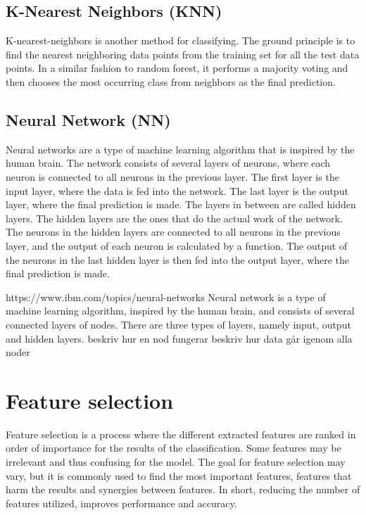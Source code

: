 \documentclass{kththesis}
\begin{document}

\subsection{K-Nearest Neighbors (KNN)}

K-nearest-neighbors is another method for classifying. The ground principle is to find the nearest neighboring data points from the training set for all the test data points. In a similar fashion to random forest, it performs a majority voting and then chooses the most occurring class from neighbors as the final prediction.


\subsection{Neural Network (NN)}

Neural networks are a type of machine learning algorithm that is inspired by the human brain. The network consists of several layers of neurons, where each neuron is connected to all neurons in the previous layer. The first layer is the input layer, where the data is fed into the network. The last layer is the output layer, where the final prediction is made. The layers in between are called hidden layers. The hidden layers are the ones that do the actual work of the network. The neurons in the hidden layers are connected to all neurons in the previous layer, and the output of each neuron is calculated by a function. The output of the neurons in the last hidden layer is then fed into the output layer, where the final prediction is made.


https://www.ibm.com/topics/neural-networks
Neural network is a type of machine learning algorithm, inspired by the human brain, and consists of several connected layers of nodes. There are three types of layers, namely input, output and hidden layers. 
beskriv hur en nod fungerar
beskriv hur data går igenom alla noder

\section{Feature selection}


Feature selection is a process where the different extracted features are ranked in order of importance for the results of the classification. Some features may be irrelevant and thus confusing for the model. The goal for feature selection may vary, but it is commonly used to find the most important features, features that harm the results and synergies between features. In short, reducing the number of features utilized, improves performance and accuracy. %
\end{document}
